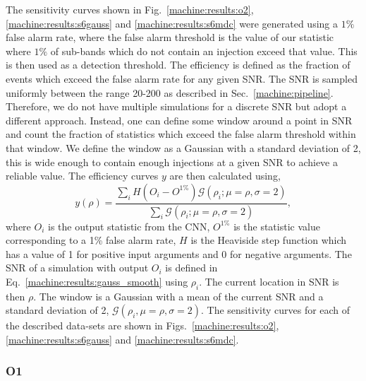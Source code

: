 %
The sensitivity curves shown in Fig.~\ref{machine:results:o2}, \ref{machine:results:s6gauss} and
\ref{machine:results:s6mdc} were generated using a $1\%$ false alarm rate, where the
false alarm threshold is the value of our statistic where $1\%$ of sub-bands
which do not contain an injection exceed that value. This is then used as a
detection threshold. The efficiency is defined as the fraction of events which
exceed the false alarm rate for any given \gls{SNR}.  The \gls{SNR} is sampled
uniformly between the range 20-200 as described in Sec.~\ref{machine:pipeline}.
Therefore, we do not have multiple simulations for a discrete \gls{SNR} but adopt a different approach.
Instead, one can define some window around a point in \gls{SNR} and count the fraction of statistics which
exceed the false alarm threshold within that window.  We define the window as a
Gaussian with a standard deviation of 2, this is wide enough to contain enough
injections at a given \gls{SNR} to achieve a reliable value.
The efficiency curves $y$ are then calculated using,
%
\begin{equation}
\label{machine:results:gauss_smooth}
y(\rho) = \frac{\sum_i H(O_i - O^{1\%}) \mathcal{G}(\rho_i;\mu=\rho,\sigma=2)}{\sum_i
\mathcal{G}(\rho_i;\mu=\rho,\sigma=2)},
\end{equation}
%
where $O_i$ is the output statistic from the \gls{CNN}, $O^{1\%}$ is the
statistic value corresponding to a 1\% false alarm rate, $H$ is the Heaviside
step function which has a value of 1 for positive input arguments and 0 for negative arguments. 
The \gls{SNR} of a simulation with output $O_i$ is defined in Eq.~\ref{machine:results:gauss_smooth} using $\rho_i$. The current location in \gls{SNR} is then $\rho$.
The window is a Gaussian with a mean of the current \gls{SNR} and a standard deviation of 2, $\mathcal{G}(\rho_i, \mu = \rho,\sigma=2)$. 
 The sensitivity curves for each of the described data-sets are shown in
Figs.~\ref{machine:results:o2}, \ref{machine:results:s6gauss} and \ref{machine:results:s6mdc}.

\subsubsection{O1}

